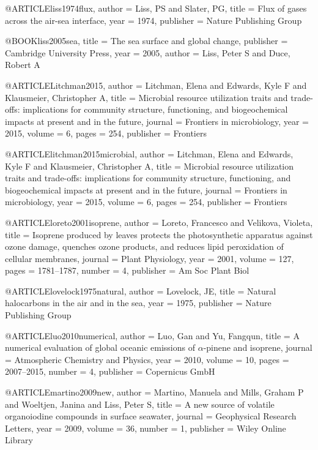 @ARTICLE{liss1974flux,
  author = {Liss, PS and Slater, PG},
  title = {Flux of gases across the air-sea interface},
  year = {1974},
  publisher = {Nature Publishing Group}
}

@BOOK{liss2005sea,
  title = {The sea surface and global change},
  publisher = {Cambridge University Press},
  year = {2005},
  author = {Liss, Peter S and Duce, Robert A}
}

@ARTICLE{Litchman2015,
  author = {Litchman, Elena and Edwards, Kyle F and Klausmeier, Christopher A},
  title = {Microbial resource utilization traits and trade-offs: implications
	for community structure, functioning, and biogeochemical impacts
	at present and in the future},
  journal = {Frontiers in microbiology},
  year = {2015},
  volume = {6},
  pages = {254},
  publisher = {Frontiers}
}

@ARTICLE{litchman2015microbial,
  author = {Litchman, Elena and Edwards, Kyle F and Klausmeier, Christopher A},
  title = {Microbial resource utilization traits and trade-offs: implications
	for community structure, functioning, and biogeochemical impacts
	at present and in the future},
  journal = {Frontiers in microbiology},
  year = {2015},
  volume = {6},
  pages = {254},
  publisher = {Frontiers}
}

@ARTICLE{loreto2001isoprene,
  author = {Loreto, Francesco and Velikova, Violeta},
  title = {Isoprene produced by leaves protects the photosynthetic apparatus
	against ozone damage, quenches ozone products, and reduces lipid
	peroxidation of cellular membranes},
  journal = {Plant Physiology},
  year = {2001},
  volume = {127},
  pages = {1781--1787},
  number = {4},
  publisher = {Am Soc Plant Biol}
}

@ARTICLE{lovelock1975natural,
  author = {Lovelock, JE},
  title = {Natural halocarbons in the air and in the sea},
  year = {1975},
  publisher = {Nature Publishing Group}
}

@ARTICLE{luo2010numerical,
  author = {Luo, Gan and Yu, Fangqun},
  title = {A numerical evaluation of global oceanic emissions of $\alpha$-pinene
	and isoprene},
  journal = {Atmospheric Chemistry and Physics},
  year = {2010},
  volume = {10},
  pages = {2007--2015},
  number = {4},
  publisher = {Copernicus GmbH}
}

@ARTICLE{martino2009new,
  author = {Martino, Manuela and Mills, Graham P and Woeltjen, Janina and Liss,
	Peter S},
  title = {A new source of volatile organoiodine compounds in surface seawater},
  journal = {Geophysical Research Letters},
  year = {2009},
  volume = {36},
  number = {1},
  publisher = {Wiley Online Library}
}

